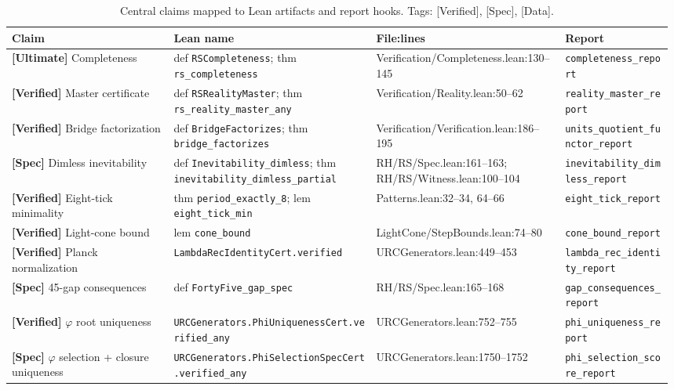 \documentclass[11pt,a4paper,twoside]{article}
\numberwithin{equation}{section}
\theoremstyle{customthm}
\theoremstyle{customdef}
\theoremstyle{customrem}
\begin{document}
\begin{table}[t]
\centering
\small
\caption{Central claims mapped to Lean artifacts and report hooks. Tags: [Verified], [Spec], [Data].}
\begin{tabular}{@{}p{0.24\linewidth} p{0.30\linewidth} p{0.28\linewidth} p{0.16\linewidth}@{}}
\toprule
\textbf{Claim} & \textbf{Lean name} & \textbf{File:lines} & \textbf{Report} \\
\midrule
\textbf{[Ultimate]} Completeness & def \texttt{RSCompleteness}; thm \texttt{rs\_completeness} & Verification/Completeness.lean:130--145 & \texttt{completeness\_report} \\
\textbf{[Verified]} Master certificate & def \texttt{RSRealityMaster}; thm \texttt{rs\_reality\_master\_any} & Verification/Reality.lean:50--62 & \texttt{reality\_master\_report} \\
\textbf{[Verified]} Bridge factorization & def \texttt{BridgeFactorizes}; thm \texttt{bridge\_factorizes} & Verification/Verification.lean:186--195 & \texttt{units\_quotient\_functor\_report} \\
\textbf{[Spec]} Dimless inevitability & def \texttt{Inevitability\_dimless}; thm \texttt{inevitability\_dimless\_partial} & RH/RS/Spec.lean:161--163; RH/RS/Witness.lean:100--104 & \texttt{inevitability\_dimless\_report} \\
\textbf{[Verified]} Eight-tick minimality & thm \texttt{period\_exactly\_8}; lem \texttt{eight\_tick\_min} & Patterns.lean:32--34, 64--66 & \texttt{eight\_tick\_report} \\
\textbf{[Verified]} Light-cone bound & lem \texttt{cone\_bound} & LightCone/StepBounds.lean:74--80 & \texttt{cone\_bound\_report} \\
\textbf{[Verified]} Planck normalization & \texttt{LambdaRecIdentityCert.verified} & URCGenerators.lean:449--453 & \texttt{lambda\_rec\_identity\_report} \\
\textbf{[Spec]} 45-gap consequences & def \texttt{FortyFive\_gap\_spec} & RH/RS/Spec.lean:165--168 & \texttt{gap\_consequences\_report} \\
\textbf{[Verified]} $\varphi$ root uniqueness & \texttt{URCGenerators.PhiUniquenessCert.verified\_any} & URCGenerators.lean:752--755 & \texttt{phi\_uniqueness\_report} \\
\textbf{[Spec]} $\varphi$ selection + closure uniqueness & \texttt{URCGenerators.PhiSelectionSpecCert.verified\_any} & URCGenerators.lean:1750--1752 & \texttt{phi\_selection\_score\_report} \\
\bottomrule
\end{tabular}
\end{table}
\end{document}
